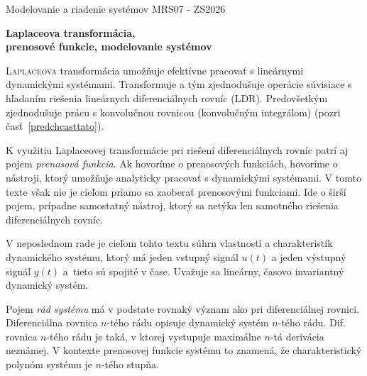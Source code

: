 \documentclass[a4paper, 10pt, ]{article}
\def\oznacenieCasti{MRS07 - ZS2026}
\begin{document}
\lstset{style=mystyle}



\fontsize{12pt}{22pt}\selectfont

\centerline{\textsf{Modelovanie a riadenie systémov} \hfill \textsf{\oznacenieCasti}}

\fontsize{18pt}{22pt}\selectfont





\begin{flushleft}
	\textbf{\textsf{Laplaceova transformácia,\\ prenosové funkcie, modelovanie systémov}}
\end{flushleft}





\normalsize


{\hypersetup{hidelinks}

\tableofcontents

}

\bigskip

\vspace{18pt}



\noindent
\lettrine[lines=3, nindent=0pt]{L}{aplaceova} transformácia umožňuje efektívne pracovať s lineárnymi dynamickými systémami. Transformuje a tým zjednodušuje operácie súvisiace s hľadaním riešenia lineárnych diferenciálnych rovníc (LDR). Predovšetkým zjednodušuje prácu s konvolučnou rovnicou (konvolučným integrálom) (pozri časť~\ref{predchcasttato}).

K využitiu Laplaceovej transformácie pri riešení diferenciálnych rovníc patrí aj pojem \emph{prenosová funkcia}. Ak hovoríme o prenosových funkciách, hovoríme o nástroji, ktorý umožňuje analyticky pracovať s dynamickými systémami. V tomto texte však nie je cieľom priamo sa zaoberať prenosovými funkciami. Ide o širší pojem, prípadne samostatný nástroj, ktorý sa netýka len samotného riešenia diferenciálnych rovníc.

V neposlednom rade je cieľom tohto textu súhrn vlastností a charakteristík dynamického systému, ktorý má jeden vstupný signál $u(t)$ a jeden výstupný signál $y(t)$ a~tieto sú spojité v čase. Uvažuje sa lineárny, časovo invariantný dynamický systém.

Pojem \emph{rád systému} má v podstate rovnaký význam ako pri diferenciálnej rovnici. Diferenciálna rovnica $n$-tého rádu opisuje dynamický systém $n$-tého rádu. Dif. rovnica $n$-tého rádu je taká, v ktorej vystupuje maximálne $n$-tá derivácia neznámej. V kontexte prenosovej funkcie systému to znamená, že charakteristický polynóm systému je $n$-tého stupňa.
\end{document}
